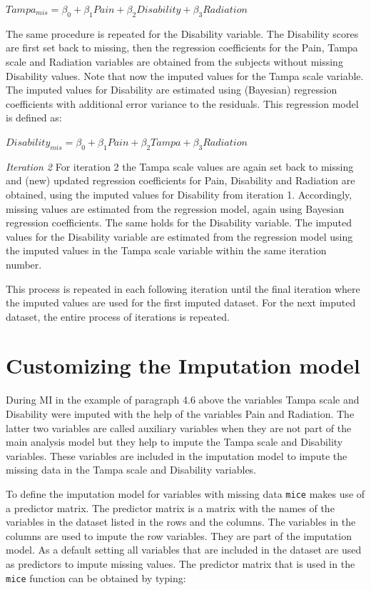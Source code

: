 \documentclass[
]{book}
\begin{document}
\(Tampa_{mis} = \beta_0 + \beta_1Pain + \beta_2Disability + \beta_3Radiation\)

The same procedure is repeated for the Disability variable. The
Disability scores are first set back to missing, then the regression
coefficients for the Pain, Tampa scale and Radiation variables are
obtained from the subjects without missing Disability values. Note that
now the imputed values for the Tampa scale variable. The imputed values
for Disability are estimated using (Bayesian) regression coefficients
with additional error variance to the residuals. This regression model
is defined as:

\(Disability_{mis} = \beta_0 + \beta_1Pain + \beta_2Tampa + \beta_3Radiation\)

\emph{Iteration 2} For iteration 2 the Tampa scale values are again set
back to missing and (new) updated regression coefficients for Pain,
Disability and Radiation are obtained, using the imputed values for
Disability from iteration 1. Accordingly, missing values are estimated
from the regression model, again using Bayesian regression coefficients.
The same holds for the Disability variable. The imputed values for the
Disability variable are estimated from the regression model using the
imputed values in the Tampa scale variable within the same iteration
number.

This process is repeated in each following iteration until the final
iteration where the imputed values are used for the first imputed
dataset. For the next imputed dataset, the entire process of iterations
is repeated.

\hypertarget{customizing-the-imputation-model-1}{%
\section{Customizing the Imputation
model}\label{customizing-the-imputation-model-1}}

During MI in the example of paragraph 4.6 above the variables Tampa
scale and Disability were imputed with the help of the variables Pain
and Radiation. The latter two variables are called auxiliary variables
when they are not part of the main analysis model but they help to
impute the Tampa scale and Disability variables. These variables are
included in the imputation model to impute the missing data in the Tampa
scale and Disability variables.

To define the imputation model for variables with missing data
\texttt{mice} makes use of a predictor matrix. The predictor matrix is a
matrix with the names of the variables in the dataset listed in the rows
and the columns. The variables in the columns are used to impute the row
variables. They are part of the imputation model. As a default setting
all variables that are included in the dataset are used as predictors to
impute missing values. The predictor matrix that is used in the
\texttt{mice} function can be obtained by typing:
\end{document}
